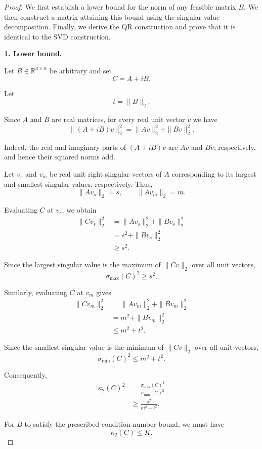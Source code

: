 \documentclass[11pt, reqno, a4paper]{amsart}
\theoremstyle{plain}
\theoremstyle{definition}
\theoremstyle{remark}
\numberwithin{equation}{section}
\begin{document}
\begin{proof}

We first establish a lower bound for the norm of any feasible
matrix $B$. We then construct a matrix attaining this bound
using the singular value decomposition. Finally, we derive the
QR construction and prove that it is identical to the SVD
construction.

\medskip

\noindent
\textbf{1. Lower bound.}

Let $B\in\mathbb{R}^{n\times n}$ be arbitrary and set
\[
C=A+iB.
\]

Let
\[
t=\|B\|_2.
\]

Since $A$ and $B$ are real matrices, for every real unit vector
$v$ we have
\[
\|(A+iB)v\|_2^2
=
\|Av\|_2^2+\|Bv\|_2^2.
\]

Indeed, the real and imaginary parts of $(A+iB)v$ are
$Av$ and $Bv$, respectively, and hence their squared norms
add.

Let $v_s$ and $v_m$ be real unit right singular vectors of
$A$ corresponding to its largest and smallest singular values,
respectively. Thus,
\[
\|Av_s\|_2=s,
\qquad
\|Av_m\|_2=m.
\]

Evaluating $C$ at $v_s$, we obtain
\begin{align*}
\|Cv_s\|_2^2
&=
\|Av_s\|_2^2+\|Bv_s\|_2^2\\
&=
s^2+\|Bv_s\|_2^2\\
&\geq s^2.
\end{align*}

Since the largest singular value is the maximum of
$\|Cv\|_2$ over all unit vectors,
\[
\sigma_{\max}(C)^2\geq s^2.
\]

Similarly, evaluating $C$ at $v_m$ gives
\begin{align*}
\|Cv_m\|_2^2
&=
\|Av_m\|_2^2+\|Bv_m\|_2^2\\
&=
m^2+\|Bv_m\|_2^2\\
&\leq m^2+t^2.
\end{align*}

Since the smallest singular value is the minimum of
$\|Cv\|_2$ over all unit vectors,
\[
\sigma_{\min}(C)^2\leq m^2+t^2.
\]

Consequently,
\begin{align*}
\kappa_2(C)^2
&=
\frac{\sigma_{\max}(C)^2}
{\sigma_{\min}(C)^2}\\
&\geq
\frac{s^2}{m^2+t^2}.
\end{align*}

For $B$ to satisfy the prescribed condition number bound,
we must have
\[
\kappa_2(C)\leq K.
\]


\end{proof}
\end{document}
